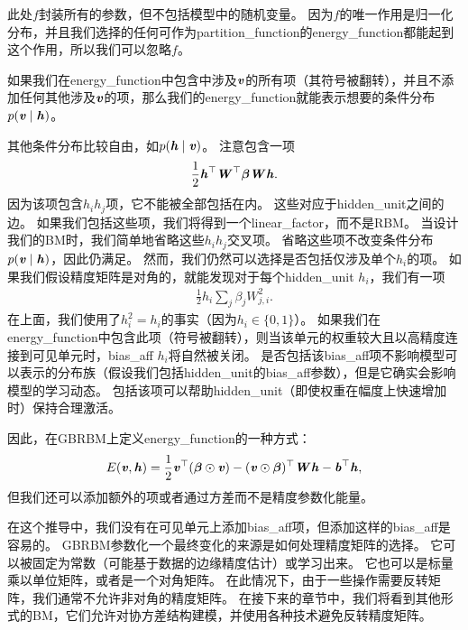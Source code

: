 
此处$f$封装所有的参数，但不包括模型中的随机变量。
因为$f$的唯一作用是归一化分布，并且我们选择的任何可作为\gls{partition_function}的\gls{energy_function}都能起到这个作用，所以我们可以忽略$f$。

如果我们在\gls{energy_function}中包含中涉及$\boldsymbol{\mathit{v}}$的所有项（其符号被翻转），并且不添加任何其他涉及$\boldsymbol{\mathit{v}}$的项，那么我们的\gls{energy_function}就能表示想要的条件分布$p(\boldsymbol{\mathit{v}}  \mid  \boldsymbol{\mathit{h}})$。

其他条件分布比较自由，如$p(\boldsymbol{\mathit{h}}  \mid  \boldsymbol{\mathit{v}})$。
注意包含一项
\begin{align}
 \frac{1}{2}\boldsymbol{\mathit{h}}^\top\boldsymbol{\mathit{W}}^\top \boldsymbol{\beta} \boldsymbol{\mathit{W}} \boldsymbol{\mathit{h}} .
\end{align}
因为该项包含$h_i h_j$项，它不能被全部包括在内。
这些对应于\gls{hidden_unit}之间的边。
如果我们包括这些项，我们将得到一个\gls{linear_factor}，而不是\gls{RBM}。
当设计我们的\gls{BM}时，我们简单地省略这些$h_i h_j$交叉项。
省略这些项不改变条件分布$p(\boldsymbol{\mathit{v}}  \mid  \boldsymbol{\mathit{h}})$，因此仍满足。
然而，我们仍然可以选择是否包括仅涉及单个$h_i$的项。
如果我们假设精度矩阵是对角的，就能发现对于每个\gls{hidden_unit} $h_i$，我们有一项
\begin{align}
 \frac{1}{2} h_i \sum_j \beta_j W_{j,i}^2.
\end{align}
在上面，我们使用了$h_i^2 = h_i$的事实（因为$h_i \in \{ 0, 1\}$）。
如果我们在\gls{energy_function}中包含此项（符号被翻转），则当该单元的权重较大且以高精度连接到可见单元时，\gls{bias_aff} $h_i$将自然被关闭。
是否包括该\gls{bias_aff}项不影响模型可以表示的分布族（假设我们包括\gls{hidden_unit}的\gls{bias_aff}参数），但是它确实会影响模型的学习动态。
包括该项可以帮助\gls{hidden_unit}（即使权重在幅度上快速增加时）保持合理激活。

因此，在\gls{GBRBM}上定义\gls{energy_function}的一种方式：
\begin{align}
 E(\boldsymbol{\mathit{v}}, \boldsymbol{\mathit{h}}) = \frac{1}{2} \boldsymbol{\mathit{v}}^\top (\boldsymbol{\beta} \odot \boldsymbol{\mathit{v}}) -  (\boldsymbol{\mathit{v}} \odot \boldsymbol{\beta})^\top\boldsymbol{\mathit{W}} \boldsymbol{\mathit{h}} - \boldsymbol{\mathit{b}}^\top \boldsymbol{\mathit{h}},
\end{align}
但我们还可以添加额外的项或者通过方差而不是精度参数化能量。


在这个推导中，我们没有在可见单元上添加\gls{bias_aff}项，但添加这样的\gls{bias_aff}是容易的。
\gls{GBRBM}参数化一个最终变化的来源是如何处理精度矩阵的选择。
它可以被固定为常数（可能基于数据的边缘精度估计）或学习出来。
它也可以是标量乘以单位矩阵，或者是一个对角矩阵。
在此情况下，由于一些操作需要反转矩阵，我们通常不允许非对角的精度矩阵。
在接下来的章节中，我们将看到其他形式的\gls{BM}，它们允许对协方差结构建模，并使用各种技术避免反转精度矩阵。


